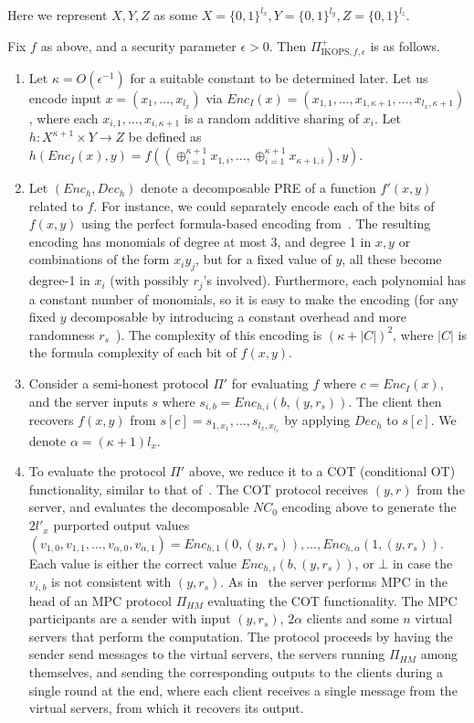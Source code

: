 \documentclass{llncs}
\begin{document}
Here we represent  $X,Y,Z$ as some $X=\{0,1\}^{l_x},Y=\{0,1\}^{l_y},Z=\{0,1\}^{l_z}$. 
\begin{construction}\label{con-ikops+} 
	Fix $f$ as above, and a security parameter $\epsilon>0$. 
	Then $\Pi^+_{\text{IKOPS},f,\epsilon}$ is as follows.
	\begin{enumerate}	
	\item Let $\kappa=O(\epsilon^{-1})$ for a suitable constant to be determined later.
	 Let us encode input $x=(x_1,\ldots,x_{l_x})$ via
	$Enc_I(x)=(x_{1,1},\ldots,x_{1,\kappa+1},\ldots,x_{l_x,\kappa+1})$, where each $x_{i,1},\ldots,x_{i,\kappa+1}$ is a random additive sharing of $x_i$. Let $h:X^{\kappa+1}\times Y\rightarrow Z$ be defined as $h(Enc_I(x),y)=f((\oplus^{\kappa+1}_{i=1}x_{1,i},\ldots,\oplus^{\kappa+1}_{i=1}x_{\kappa+1,i}),y)$. 
	\item Let $(Enc_h,Dec_h)$ denote a decomposable PRE of a function $f'(x,y)$ related to $f$. For instance, we could separately encode each of the bits of $f(x,y)$ using the perfect formula-based encoding from~\cite{IK02}.
	The resulting encoding has monomials of degree at most 3, and degree 1 in $x,y$ or combinations of the form $x_iy_j$, but for a fixed value of $y$, all these become degree-1 in $x_i$ (with possibly $r_j$'s involved). Furthermore, each polynomial has a constant number of monomials, so it is easy to make the encoding (for any fixed $y$ decomposable by introducing a constant overhead and more randomness $r_s$~\cite{}). The complexity of this encoding is $(\kappa+|C|)^2$, where $|C|$ is the formula complexity of each bit of $f(x,y)$.
	\item Consider a semi-honest protocol $\Pi'$ for evaluating $f$ where $c=Enc_I(x)$, and the server inputs $s$ where $s_{i,b}=Enc_{h,i}(b,(y,r_s))$. The client then recovers $f(x,y)$ from
	$s[c]=s_{1,x_1},\ldots,s_{l_x,x_{l_x}}$ by applying $Dec_h$ to $s[c]$.
	We denote $\alpha=(\kappa+1)l_x$.%
	\item To evaluate the protocol $\Pi'$ above, we reduce it to a COT (conditional OT) functionality, similar to that of~\cite{IKOPS11}. The COT protocol receives $(y,r)$ from the server, and evaluates the decomposable $NC_0$ encoding above to generate the $2l'_x$ purported output values 
	$(v_{1,0},v_{1,1},\ldots,v_{\alpha,0},v_{\alpha,1})=Enc_{h,1}(0,(y,r_s)),\ldots,Enc_{h,\alpha}(1,(y,r_s))$.   
	Each value is either the correct value $Enc_{h,i}(b,(y,r_s))$, or $\bot$ in case the $v_{i,b}$ is not consistent with $(y,r_s)$.
	As in~\cite{IKOPS11} the server performs MPC in the head 
	of an MPC protocol $\Pi_{HM}$ evaluating the COT functionality.
	The MPC participants are a sender with input $(y,r_s)$, $2\alpha$ clients and some $n$ virtual servers that perform the computation. The protocol proceeds by having the sender send messages to the virtual servers, the servers running $\Pi_{HM}$ among themselves, and sending the corresponding outputs to the clients during a single round at the end, where each client receives a single message from the virtual servers, from which it recovers its output.
	

\end{enumerate}
\end{construction}
\end{document}
